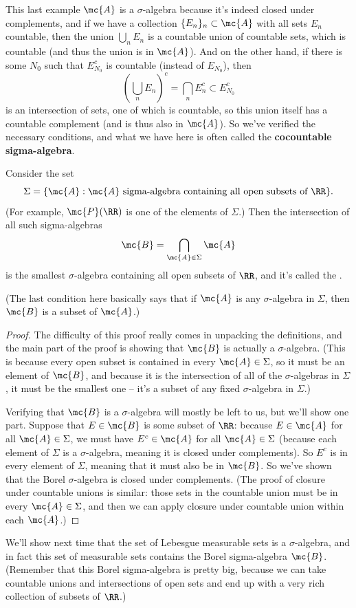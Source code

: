 This last example $\mc{A}$ is a $\sigma$-algebra because it's indeed closed under complements, and if we have a collection $\{E_n\}_n \subset \mc{A}$ with all sets $E_n$ countable, then the union $\bigcup_{n} E_n$ is a countable union of countable sets, which is countable (and thus the union is in $\mc{A}$). And on the other hand, if there is some $N_0$ such that $E_{N_0}^c$ is countable (instead of $E_{N_0}$), then
\[
    \left(\bigcup_n E_n\right)^c = \bigcap_{n} E_n^c \subset E_{N_0}^c
\]  
is an intersection of sets, one of which is countable, so this union itself has a countable complement (and is thus also in $\mc{A}$). So we've verified the necessary conditions, and what we have here is often called the \textbf{cocountable sigma-algebra}.

\begin{proposition}
Consider the set 
\[
    \Sigma = \{\mc{A}: \mc{A} \text{ sigma-algebra containing all open subsets of }\RR\}.
\]
(For example, $\mc{P}(\RR)$ is one of the elements of $\Sigma$.) Then the intersection of all such sigma-algebras
\[
    \mc{B} = \bigcap_{\mc{A} \in \Sigma} \mc{A}
\]
is the smallest $\sigma$-algebra containing all open subsets of $\RR$, and it's called the .
\end{proposition}

(The last condition here basically says that if $\mc{A}$ is any $\sigma$-algebra in $\Sigma$, then $\mc{B}$ is a subset of $\mc{A}$.)

\begin{proof}
The difficulty of this proof really comes in unpacking the definitions, and the main part of the proof is showing that $\mc{B}$ is actually a $\sigma$-algebra. (This is because every open subset is contained in every $\mc{A} \in \Sigma$, so it must be an element of $\mc{B}$, and because it is the intersection of all of the $\sigma$-algebras in $\Sigma$, it must be the smallest one -- it's a subset of any fixed $\sigma$-algebra in $\Sigma$.)

Verifying that $\mc{B}$ is a $\sigma$-algebra will mostly be left to us, but we'll show one part. Suppose that $E \in \mc{B}$ is some subset of $\RR$: because $E \in \mc{A}$ for all $\mc{A} \in \Sigma$, we must have $E^c \in \mc{A}$ for all $\mc{A} \in \Sigma$ (because each element of $\Sigma$ is a $\sigma$-algebra, meaning it is closed under complements). So $E^c$ is in every element of $\Sigma$, meaning that it must also be in $\mc{B}$. So we've shown that the Borel $\sigma$-algebra is closed under complements. (The proof of closure under countable unions is similar: those sets in the countable union must be in every $\mc{A} \in \Sigma$, and then we can apply closure under countable union within each $\mc{A}$.)
\end{proof}

We'll show next time that the set of Lebesgue measurable sets is a $\sigma$-algebra, and in fact this set of measurable sets contains the Borel sigma-algebra $\mc{B}$. (Remember that this Borel sigma-algebra is pretty big, because we can take countable unions and intersections of open sets and end up with a very rich collection of subsets of $\RR$.)